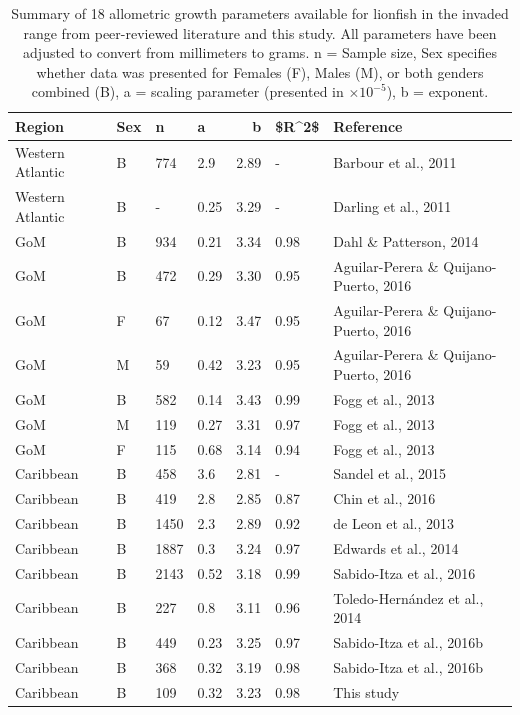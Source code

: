 \documentclass[fleqn,10pt,lineno]{wlpeerj} %
\begin{document}
\begin{table}[t]

\caption{\label{tab:unnamed-chunk-7}\label{tab:all_params}Summary of 18 allometric growth parameters available for lionfish in the invaded range from peer-reviewed literature and this study. All parameters have been adjusted to convert from millimeters to grams. n = Sample size, Sex specifies whether data was presented for Females (F), Males (M), or both genders combined (B), a = scaling parameter (presented in $\times 10^{-5}$), b = exponent.}
\centering
\begin{tabular}{llllrll}
\toprule
Region & Sex & n & a & b & \$R\textasciicircum{}2\$ & Reference\\
\midrule
Western Atlantic & B & 774 & 2.9 & 2.89 & - & Barbour et al., 2011\\
Western Atlantic & B & - & 0.25 & 3.29 & - & Darling et al., 2011\\
GoM & B & 934 & 0.21 & 3.34 & 0.98 & Dahl \& Patterson, 2014\\
GoM & B & 472 & 0.29 & 3.30 & 0.95 & Aguilar-Perera \& Quijano-Puerto, 2016\\
GoM & F & 67 & 0.12 & 3.47 & 0.95 & Aguilar-Perera \& Quijano-Puerto, 2016\\
\addlinespace
GoM & M & 59 & 0.42 & 3.23 & 0.95 & Aguilar-Perera \& Quijano-Puerto, 2016\\
GoM & B & 582 & 0.14 & 3.43 & 0.99 & Fogg et al., 2013\\
GoM & M & 119 & 0.27 & 3.31 & 0.97 & Fogg et al., 2013\\
GoM & F & 115 & 0.68 & 3.14 & 0.94 & Fogg et al., 2013\\
Caribbean & B & 458 & 3.6 & 2.81 & - & Sandel et al., 2015\\
\addlinespace
Caribbean & B & 419 & 2.8 & 2.85 & 0.87 & Chin et al., 2016\\
Caribbean & B & 1450 & 2.3 & 2.89 & 0.92 & de Leon et al., 2013\\
Caribbean & B & 1887 & 0.3 & 3.24 & 0.97 & Edwards et al., 2014\\
Caribbean & B & 2143 & 0.52 & 3.18 & 0.99 & Sabido-Itza et al., 2016\\
Caribbean & B & 227 & 0.8 & 3.11 & 0.96 & Toledo-Hernández et al., 2014\\
\addlinespace
Caribbean & B & 449 & 0.23 & 3.25 & 0.97 & Sabido-Itza et al., 2016b\\
Caribbean & B & 368 & 0.32 & 3.19 & 0.98 & Sabido-Itza et al., 2016b\\
Caribbean & B & 109 & 0.32 & 3.23 & 0.98 & This study\\
\bottomrule
\end{tabular}
\end{table}
\end{document}

